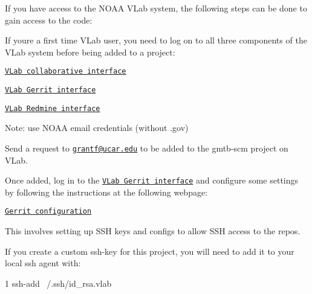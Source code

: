 If you have access to the N\+O\+AA V\+Lab system, the following steps can be done to gain access to the code\+:
\begin{DoxyItemize}
\item If you\textquotesingle{}re a first time V\+Lab user, you need to log on to all three components of the V\+Lab system before being added to a project\+:
\begin{DoxyItemize}
\item \href{https://vlab.ncep.noaa.gov/}{\tt V\+Lab collaborative interface}
\item \href{https://vlab.ncep.noaa.gov/code-review/}{\tt V\+Lab Gerrit interface}
\item \href{https://vlab.ncep.noaa.gov/redmine/}{\tt V\+Lab Redmine interface}
\item Note\+: use N\+O\+AA email credentials (without .gov)
\end{DoxyItemize}
\item Send a request to \href{mailto:grantf@ucar.edu}{\tt grantf@ucar.\+edu} to be added to the gmtb-\/scm project on V\+Lab.
\item Once added, log in to the \href{https://vlab.ncep.noaa.gov/code-review/}{\tt V\+Lab Gerrit interface} and configure some settings by following the instructions at the following webpage\+:
\begin{DoxyItemize}
\item \href{https://vlab.ncep.noaa.gov/redmine/projects/vlab/wiki/Gerrit_Configuration}{\tt Gerrit configuration}
\item This involves setting up S\+SH keys and configs to allow S\+SH access to the repos.
\item If you create a custom ssh-\/key for this project, you will need to add it to your local ssh agent with\+:
\begin{DoxyItemize}
\item 
\begin{DoxyCode}
1 ssh-add ~/.ssh/id\_rsa.vlab 
\end{DoxyCode}


\end{DoxyItemize}
\end{DoxyItemize}
\end{DoxyItemize}

